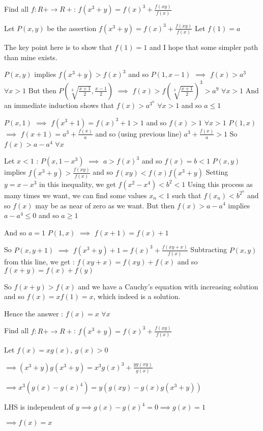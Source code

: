 \begin{solution}
	\begin{tcolorbox}Find all $f:R+ \to R+$: $f(x^3+y)=f(x)^3 + \frac{f(xy)}{f(x)}$\end{tcolorbox}
Let $P(x,y)$ be the assertion $f(x^3+y)=f(x)^3+\frac {f(xy)}{f(x)}$
Let $f(1)=a$

The key point here is to show that $f(1)=1$ and I hope that some simpler path than mine exists.


$P(x,y)$ implies $f(x^3+y)>f(x)^3$ and so $P(1,x-1)$ $\implies$ $f(x)>a^3$ $\forall x>1$
But then $P(\sqrt[3]{\frac {x+1}2},\frac {x-1}2)$ $\implies$ $f(x)>f(\sqrt[3]{\frac {x+1}2})^3>a^9$ $\forall x>1$
And an immediate induction shows that $f(x)>a^{3^n}$ $\forall x>1$ and so $\boxed{a\le 1}$

$P(x,1)$ $\implies$ $f(x^3+1)=f(x)^3+1>1$ and so $f(x)>1$ $\forall x>1$
$P(1,x)$ $\implies$ $f(x+1)=a^3+\frac{f(x)}a$ and so (using previous line) $a^3+\frac{f(x)}a>1$
So $f(x)>a-a^4$ $\forall x$

Let $x<1$ : $P(x,1-x^3)$ $\implies$ $a>f(x)^3$ and so $f(x)=b<1$
$P(x,y)$ implies $f(x^3+y)>\frac{f(xy)}{f(x)}$ and so $f(xy)<f(x)f(x^3+y)$
Setting $y=x-x^3$ in this inequality, we get $f(x^2-x^4)<b^2<1$
Using this process as many times we want, we can find some values $x_n<1$ such that $f(x_n)<b^{2^n}$ and so $f(x)$ may be as near of zero as we want.
But then $f(x)>a-a^4$ implies $a-a^4\le 0$ and so $\boxed{a\ge 1}$

And so $a=1$
$P(1,x)$ $\implies$ $f(x+1)=f(x)+1$

So $P(x,y+1)$ $\implies$ $f(x^3+y)+1=f(x)^3+\frac {f(xy+x)}{f(x)}$
Subtracting $P(x,y)$ from this line, we get : $f(xy+x)=f(xy)+f(x)$ and so $f(x+y)=f(x)+f(y)$

So $f(x+y)>f(x)$ and we have a Cauchy's equation with increasing solution and so $f(x)=xf(1)=x$, which indeed is a solution.

Hence the answer : $\boxed{f(x)=x}$ $\forall x$
\end{solution}



\begin{solution}
	\begin{tcolorbox}Find all $f:R+ \to R+$: $f(x^3+y)=f(x)^3 + \frac{f(xy)}{f(x)}$\end{tcolorbox}

Let $f(x)=xg(x),\ g(x)>0$

$\implies (x^3+y)g(x^3+y)=x^3g(x)^3 + \frac{yg(xy)}{g(x)}$

$\implies x^3(g(x)-g(x)^4)=y(g(xy)-g(x)g(x^3+y))$

LHS is independent of $y\implies g(x)-g(x)^4=0\implies g(x)=1$

$\implies f(x)=x$
\end{solution}



